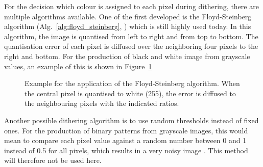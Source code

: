 %
For the decision which colour is assigned to each pixel during dithering, there are multiple algorithms available. One of the first developed is the Floyd-Steinberg algorithm (Alg.~\ref{alg:floyd_steinberg}, \cite{floydsteinberg:1976}) which is still highly used today. In this algorithm, the image is quantised from left to right and from top to bottom. The quantisation error of each pixel is diffused over the neighboring four pixels to the right and bottom. For the production of black and white image from grayscale values, an example of this is shown in Figure~\ref{fig:floyd_steinberg}
\begin{figure}[htbp]
    \centering
    
    \caption[Example for the application of the Floyd-Steinberg error diffusion algorithm]{Example for the application of the Floyd-Steinberg algorithm. When the central pixel is quantised to white (255), the error is diffused to the neighbouring pixels with the indicated ratios.}
    \label{fig:floyd_steinberg}
\end{figure}

Another possible dithering algorithm is to use random thresholds instead of fixed ones. For the production of binary patterns from grayscale images, this would mean to compare each pixel value against a random number between 0 and 1 instead of \num{0.5} for all pixels, which results in a very noisy image \cite{funkhouser:2000}. This method will therefore not be used here.

